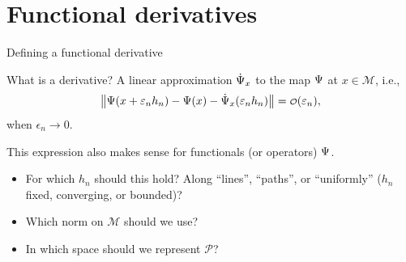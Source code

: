 \documentclass{beamer}\usepackage{listings}
\begin{document}
\section{Functional derivatives}
\label{sec:org8597c9a}
\begin{frame}[label={sec:orgc16e6c6}]{Defining a functional derivative}
\begin{block}{What is a derivative? \pause}
A linear approximation \(\dot{\operatorname{\Psi}}_x\) to the map \(\operatorname{\Psi}\) at \(x \in \mathcal{M}\), i.e.,
\begin{equation*}
  \left\Vert
    \TT(x + \epsilon_n h_n) - \TT(x) - \dot{\TT}_x(\epsilon_n h_n)
  \right\Vert = \smallO(\epsilon_n),
\end{equation*}
when \(\epsilon_n \rightarrow 0\).

\pause \hfill
\end{block}
This expression also makes sense for functionals (or operators) \(\operatorname{\Psi}\).

\pause \hfill

\begin{itemize}[<+->]
\item For which \(h_n\) should this hold? Along ``lines'', ``paths'', or ``uniformly'' (\(h_n\) fixed,
converging, or bounded)?
\item Which norm on \(\mathcal{M}\) should we use?
\item In which space should we represent \(\mathcal{P}\)?
\end{itemize}
\end{frame}
\end{document}
